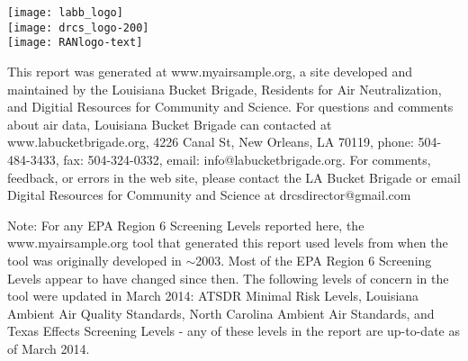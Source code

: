 \documentclass{article}
\newlength\acklength
\newlength\logowidth
\newcommand{\highlightbox}[1]{\colorbox{salmon}{\parbox{\linewidth}{#1}}}
\begin{document}
\newcommand{\standardssection}{
\section*{Sample screening levels}

\highlightbox{Some government agencies have developed standards and screening levels for
toxic chemicals in the air based on health information about the chemicals.
There is no information available for some toxic chemicals. The agencies are
listed below, with a brief description of the methods used in establishing their
levels. States may not be required to adhere to national standards.}

\begin{itemize}
\subst{standardblurbs}
\end{itemize}

}

     \vfill
     \parbox{\logowidth}{
       \texttt{[image: labb\_logo]}\\
       \vskip 0.1in
       \texttt{[image: drcs\_logo-200]}\\
       \vskip 0.1in
       \texttt{[image: RANlogo-text]}
     }
     \setlength\acklength{\textwidth}
     \addtolength\acklength{-\logowidth}
     \addtolength\acklength{-0.7in}
     \hskip 0.5in
     \parbox{\acklength}{
       \sloppy
       This report was generated at www.myairsample.org, a site
       \linebreak
       developed and maintained by the Louisiana Bucket Brigade,
       \linebreak
       Residents for Air Neutralization, and Digitial Resources for
       \linebreak
       Community and Science.  For questions and comments about air
       data, Louisiana Bucket Brigade can contacted at
       www.labucketbrigade.org, 4226 Canal St, New Orleans, LA 70119,
       phone: 504-484-3433, fax: 504-324-0332, email:
       info@labucketbrigade.org.  For comments, feedback, or errors in
       the web site, please contact the LA Bucket Brigade or email
       Digital Resources for Community and Science at
       drcsdirector@gmail.com
     }

\thispagestyle{empty}


\medskip
Note: For any EPA Region 6 Screening Levels reported here, the
www.myairsample.org tool that generated this report used levels from
when the tool was originally developed in $\sim$2003.  Most of the EPA
Region 6 Screening Levels appear to have changed since then.  The
following levels of concern in the tool were updated in March 2014:
ATSDR Minimal Risk Levels, Louisiana Ambient Air Quality Standards,
North Carolina Ambient Air Standards, and Texas Effects Screening
Levels - any of these levels in the report are up-to-date as of March
2014.

\end{document}
